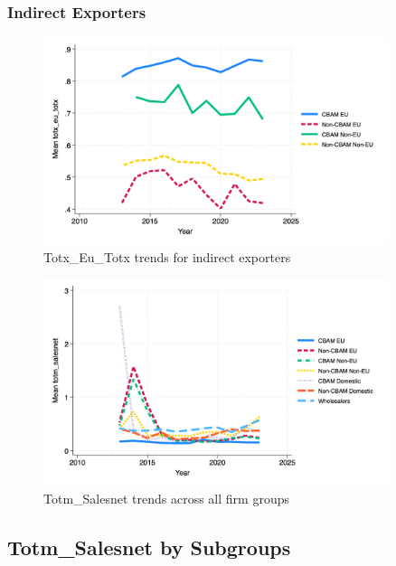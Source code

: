 \documentclass{article}
\begin{document}
\subsubsection{Indirect Exporters}
\begin{figure}[h!]
\centering
\includegraphics[width=0.9\textwidth]{totx_eu_totx_indir.png}
\caption{Totx_Eu_Totx trends for indirect exporters}
\label{fig:totx_eu_totx_indir}
\end{figure}

\begin{figure}[h!]
\centering
\includegraphics[width=0.9\textwidth]{totm_salesnet_main_groups.png}
\caption{Totm_Salesnet trends across all firm groups}
\label{fig:totm_salesnet_main}
\end{figure}

\subsection{Totm_Salesnet by Subgroups}
\end{document}
